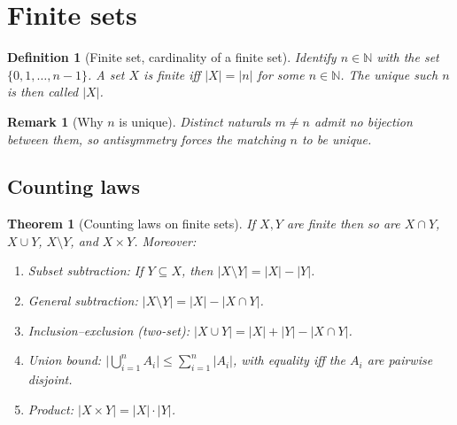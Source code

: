 \documentclass[11pt]{article}
\theoremstyle{defstyle}
\newtheorem{definition}{Definition}[section]
\theoremstyle{thmstyle}
\newtheorem{theorem}{Theorem}[section]
\theoremstyle{notstyle}
\newtheorem*{remark}{Remark}
\theoremstyle{cautionstyle}
\newcommand{\N}{\mathbb{N}}
\newcommand{\card}[1]{\lvert #1 \rvert}
\begin{document}
\section{Finite sets}

\begin{defbox}
\begin{definition}[Finite set, cardinality of a finite set]
Identify $n \in \N$ with the set $\{0, 1, \ldots, n-1\}$.
A set $X$ is \emph{finite} iff $\card{X} = \card{n}$ for some $n \in \N$.
The unique such $n$ is then called $\card{X}$.
\end{definition}
\end{defbox}

\begin{notebox}
\begin{remark}[Why $n$ is unique]
Distinct naturals $m \neq n$ admit no bijection between them, so
antisymmetry forces the matching $n$ to be unique.
\end{remark}
\end{notebox}

\subsection{Counting laws}

\begin{thmbox}
\begin{theorem}[Counting laws on finite sets]
If $X, Y$ are finite then so are $X \cap Y$, $X \cup Y$, $X \setminus Y$,
and $X \times Y$.  Moreover:
\begin{enumerate}[label=\textnormal{(\roman*)}, leftmargin=2em, itemsep=2pt]
  \item \emph{Subset subtraction:} If $Y \subseteq X$, then
        $\card{X \setminus Y} = \card{X} - \card{Y}$.
  \item \emph{General subtraction:}
        $\card{X \setminus Y} = \card{X} - \card{X \cap Y}$.
  \item \emph{Inclusion--exclusion (two-set):}
        $\card{X \cup Y} = \card{X} + \card{Y} - \card{X \cap Y}$.
  \item \emph{Union bound:}
        $\bigl|\bigcup_{i=1}^n A_i\bigr| \leq \sum_{i=1}^n \card{A_i}$,
        with equality iff the $A_i$ are pairwise disjoint.
  \item \emph{Product:} $\card{X \times Y} = \card{X} \cdot \card{Y}$.
\end{enumerate}
\end{theorem}
\end{thmbox}
\end{document}
